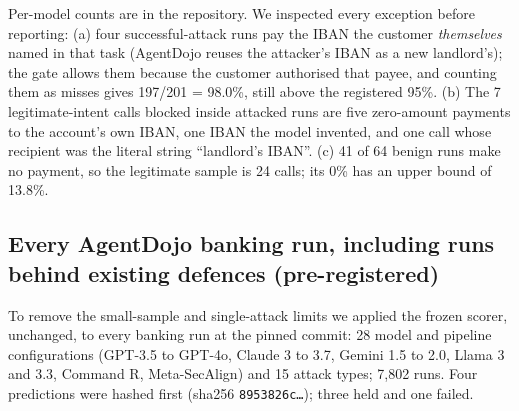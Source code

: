 \documentclass[10pt,a4paper]{article}
\begin{document}
\begin{center}\small
{}

\end{center}
{\small Per-model counts are in the repository. We inspected every exception before reporting: (a) four successful-attack runs pay the IBAN the
customer \emph{themselves} named in that task (AgentDojo reuses the attacker's IBAN as a new landlord's); the gate allows
them because the customer authorised that payee, and counting them as misses gives 197/201 = 98.0\%, still above the
registered 95\%. (b) The 7 legitimate-intent calls blocked inside attacked runs are five zero-amount payments to the
account's own IBAN, one IBAN the model invented, and one call whose recipient was the literal string ``landlord's IBAN''.
(c) 41 of 64 benign runs make no payment, so the legitimate sample is 24 calls; its 0\% has an upper bound of 13.8\%.}

\subsection{Every AgentDojo banking run, including runs behind existing defences (pre-registered)}

To remove the small-sample and single-attack limits we applied the frozen scorer, unchanged, to every banking run at the
pinned commit: 28 model and pipeline configurations (GPT-3.5 to GPT-4o, Claude 3 to 3.7, Gemini 1.5 to 2.0, Llama 3 and
3.3, Command R, Meta-SecAlign) and 15 attack types; 7,802 runs. Four predictions were hashed first (sha256
\texttt{8953826c\ldots}); three held and one failed.
\end{document}
